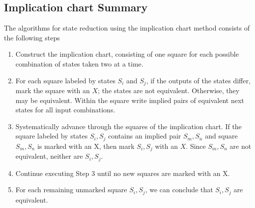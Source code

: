\subsection{Implication chart Summary}
The algorithms for state reduction using the implication chart method consists
of the following steps
\begin{enumerate}
  \item Construct the implication chart, consisting of one square for each
    possible combination of states taken two at a time.
  \item For each square labeled by states $S_i$ and $S_j$, if the outputs of the
    states differ, mark the square with an $X$; the states are not equivalent.
    Otherwise, they may be equivalent. Within the square write implied pairs of
    equivalent next states for all input combinations.
  \item Systematically advance through the squares of the implication chart. If
    the square labeled by states $S_i, S_j$ contains an implied pair $S_m, S_n$
    and square $S_m, S_n$ is marked with an X, then mark $S_i, S_j$ with an $X$.
    Since $S_m, S_n$ are not equivalent, neither are $S_i, S_j$.
  \item Continue executing Step 3 until no new squares are marked with an X.
  \item For each remaining unmarked square $S_i, S_j$, we can conclude that
    $S_i, S_j$ are equivalent.
\end{enumerate}


